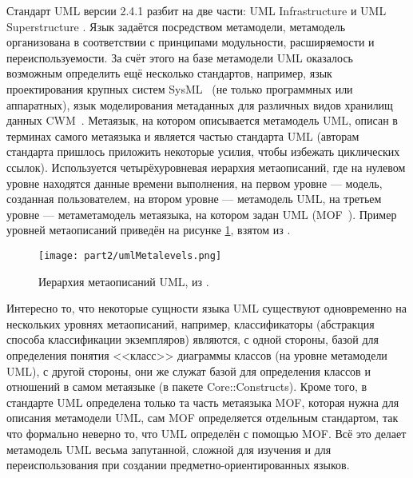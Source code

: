 Стандарт UML версии 2.4.1 разбит на две части: UML Infrastructure \cite{omg2011infrastructure} и UML Superstructure 
\cite{omg2011superstructure}. Язык задаётся посредством метамодели, метамодель организована 
в соответствии с принципами модульности, расширяемости и переиспользуемости. За счёт 
этого на базе метамодели UML оказалось возможным определить ещё несколько стандартов, например, язык 
проектирования крупных систем SysML~\cite{sysml} (не только программных или аппаратных), 
язык моделирования метаданных для различных видов хранилищ данных CWM~\cite{cwm}. 
Метаязык, на котором описывается метамодель UML, описан в терминах самого метаязыка и является 
частью стандарта UML (авторам стандарта пришлось приложить некоторые усилия, чтобы 
избежать циклических ссылок). Используется четырёхуровневая иерархия метаописаний, 
где на нулевом уровне находятся данные времени выполнения, на первом уровне --- модель, 
созданная пользователем, на втором уровне --- метамодель UML, на третьем уровне --- 
метаметамодель метаязыка, на котором задан UML (MOF~\cite{mof}). Пример уровней метаописаний 
приведён на рисунке \ref{umlMetalevels}, взятом из \cite{omg2011infrastructure}.

\begin{figure} [ht]
	\begin{center}
		\texttt{[image: part2/umlMetalevels.png]}
		\caption{Иерархия метаописаний UML, из \cite{omg2011infrastructure}.}
		\label{umlMetalevels}
	\end{center}
\end{figure}

Интересно то, что некоторые сущности языка UML существуют одновременно на нескольких 
уровнях метаописаний, например, классификаторы (абстракция способа классификации экземпляров) 
являются, с одной стороны, базой для определения понятия <<класс>> диаграммы классов 
(на уровне метамодели UML), с другой стороны, они же служат базой для определения 
классов и отношений в самом метаязыке (в пакете Core::Constructs). Кроме того, в стандарте 
UML определена только та часть метаязыка MOF, которая нужна для описания метамодели UML, 
сам MOF определяется отдельным стандартом, так что формально неверно то, что UML определён 
с помощью MOF. Всё это делает метамодель UML весьма запутанной, сложной для изучения 
и для переиспользования при создании предметно-ориентированных языков.


